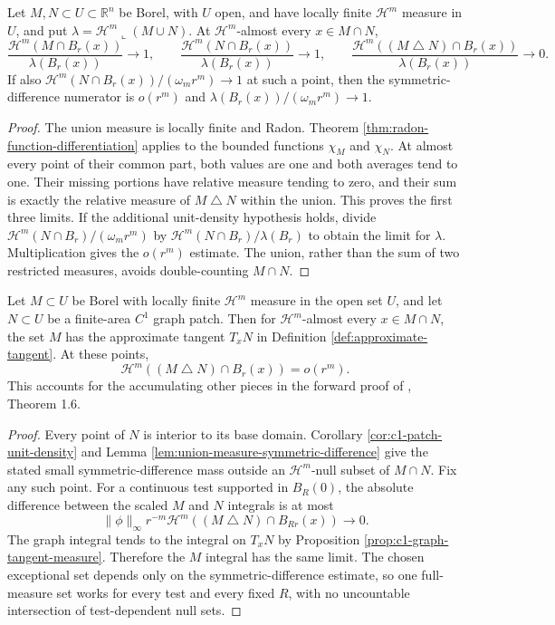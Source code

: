 \begin{lemma}\label{lem:union-measure-symmetric-difference}
Let $M,N\subset U\subset\mathbb R^n$ be Borel, with $U$ open, and have locally finite $\mathcal H^m$ measure in $U$, and put $\lambda=\mathcal H^m\llcorner(M\cup N)$. At $\mathcal H^m$-almost every $x\in M\cap N$,
\[
 \frac{\mathcal H^m(M\cap B_r(x))}{\lambda(B_r(x))}\to1,
 \qquad
 \frac{\mathcal H^m(N\cap B_r(x))}{\lambda(B_r(x))}\to1,
 \qquad
 \frac{\mathcal H^m((M\mathbin{\triangle}N)\cap B_r(x))}{\lambda(B_r(x))}\to0.
\]
If also $\mathcal H^m(N\cap B_r(x))/(\omega_mr^m)\to1$ at such a point, then the symmetric-difference numerator is $o(r^m)$ and $\lambda(B_r(x))/(\omega_mr^m)\to1$.
\end{lemma}
\begin{proof}
The union measure is locally finite and Radon. Theorem \ref{thm:radon-function-differentiation} applies to the bounded functions $\chi_M$ and $\chi_N$. At almost every point of their common part, both values are one and both averages tend to one. Their missing portions have relative measure tending to zero, and their sum is exactly the relative measure of $M\mathbin{\triangle}N$ within the union. This proves the first three limits. If the additional unit-density hypothesis holds, divide $\mathcal H^m(N\cap B_r)/(\omega_mr^m)$ by $\mathcal H^m(N\cap B_r)/\lambda(B_r)$ to obtain the limit for $\lambda$. Multiplication gives the $o(r^m)$ estimate. The union, rather than the sum of two restricted measures, avoids double-counting $M\cap N$.
\end{proof}

\begin{proposition}\label{prop:rectifiable-patch-tangent-transfer}
Let $M\subset U$ be Borel with locally finite $\mathcal H^m$ measure in the open set $U$, and let $N\subset U$ be a finite-area $C^1$ graph patch. Then for $\mathcal H^m$-almost every $x\in M\cap N$, the set $M$ has the approximate tangent $T_xN$ in Definition \ref{def:approximate-tangent}. At these points,
\[
 \mathcal H^m((M\mathbin{\triangle}N)\cap B_r(x))=o(r^m).
\]
This accounts for the accumulating other pieces in the forward proof of \cite{Sim18}, Theorem 1.6.
\end{proposition}
\begin{proof}
Every point of $N$ is interior to its base domain. Corollary \ref{cor:c1-patch-unit-density} and Lemma \ref{lem:union-measure-symmetric-difference} give the stated small symmetric-difference mass outside an $\mathcal H^m$-null subset of $M\cap N$. Fix any such point. For a continuous test supported in $B_R(0)$, the absolute difference between the scaled $M$ and $N$ integrals is at most
\[
 \|\phi\|_\infty r^{-m}
 \mathcal H^m((M\mathbin{\triangle}N)\cap B_{Rr}(x))\longrightarrow0.
\]
The graph integral tends to the integral on $T_xN$ by Proposition \ref{prop:c1-graph-tangent-measure}. Therefore the $M$ integral has the same limit. The chosen exceptional set depends only on the symmetric-difference estimate, so one full-measure set works for every test and every fixed $R$, with no uncountable intersection of test-dependent null sets.
\end{proof}

